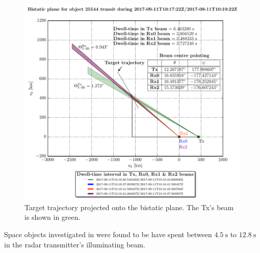\documentclass[conference]{IEEEtran}
\begin{document}
\begin{figure}[ht]
	\centering
	\includegraphics[scale=0.42]{main057iss111bistaticplane0.pdf}
	\caption[Target observation geometry visualized on the bistatic plane]{Target trajectory projected onto the bistatic plane. The Tx's beam is shown in green. }\label{fig:schedu:schedu:geom:bistaticplane}
\end{figure}

Space objects investigated in \cite{ashivmsc} were found to be have spent between $4.5~\mathrm{s}$ to $12.8~\mathrm{s}$ in the radar transmitter’s illuminating beam.
\end{document}
